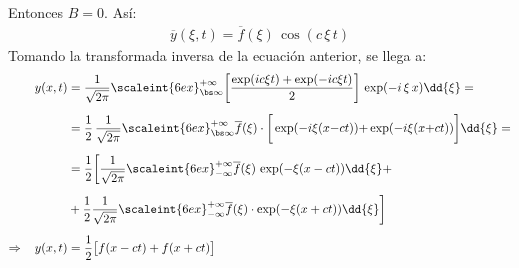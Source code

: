 Entonces  $B = 0$. Así:
\begin{align*}
\overline{y}(\xi, t) = \overline{f}(\xi) \, \cos (c \, \xi \, t)
\end{align*}
Tomando la transformada inversa de la ecuación anterior, se llega a:
\begin{align*}
y(x, t) &= \dfrac{1}{\sqrt{2 \pi}} \scaleint{6ex}_{\bs \infty}^{+ \infty} \bigg[ \dfrac{\exp(i c \xi t) + \exp(-i c \xi t)}{2} \bigg] \, \exp(-i \, \xi \, x) \dd{\xi} = \\[0.5em]
&= \dfrac{1}{2} \, \dfrac{1}{\sqrt{2 \pi}} \scaleint{6ex}_{\bs \infty}^{+ \infty} \overline{f} (\xi) \cdot \bigg[ \exp(-i \xi (x {-} c t)) {+} \exp(-i \xi (x {+} c t)) \bigg] \dd{\xi} = \\[0.5em]
&= \dfrac{1}{2} \bigg[ \dfrac{1}{\sqrt{2 \pi}} \scaleint{6ex}_{-\infty}^{+\infty} \overline{f} (\xi) \, \exp(- \xi (x - c t)) \dd{\xi} + \\[0.5em]
&+ \dfrac{1}{2} \dfrac{1}{\sqrt{2 \pi}} \scaleint{6ex}_{-\infty}^{+\infty} \overline{f} (\xi) \cdot \exp(- \xi (x + c t)) \dd{\xi} \bigg] \\[0.5em]
\Rightarrow \hspace{0.3cm} y(x, t) &= \dfrac{1}{2} \big[ f(x -c t) + f(x +  ct) \big]
\end{align*}



